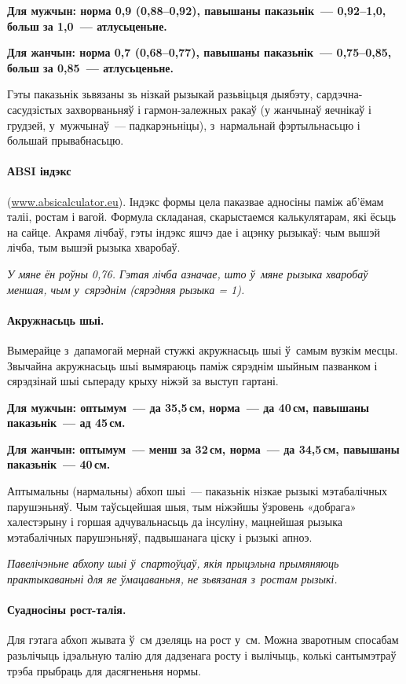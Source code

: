 \textbf{Для мужчын: норма 0,9 (0,88--0,92), павышаны паказьнік~--- 0,92--1,0, больш за 1,0~--- атлусьценьне.} 

\textbf{Для жанчын: норма 0,7 (0,68--0,77), павышаны паказьнік~--- 0,75--0,85, больш за 0,85~--- атлусьценьне.}

Гэты паказьнік зьвязаны зь нізкай рызыкай разьвіцьця дыябэту, сардэчна-сасудзістых захворваньняў і гармон-залежных ракаў (у жанчынаў яечнікаў і грудзей, у~мужчынаў~--- падкарэньніцы), з~нармальнай фэртыльнасьцю і большай прывабнасьцю.

\paragraph{АBSI індэкс} (\url{www.absicalculator.eu}). Індэкс формы цела паказвае адносіны паміж аб'ёмам таліі, ростам і вагой. Формула складаная, скарыстаемся калькулятарам, які ёсьць на сайце. Акрамя лічбаў, гэты індэкс яшчэ дае і ацэнку рызыкаў: чым вышэй лічба, тым вышэй рызыка хваробаў. 

\emph{У мяне ён роўны 0,76. Гэтая лічба азначае, што ў~мяне рызыка хваробаў меншая, чым у~сярэднім (сярэдняя рызыка = 1).}

\paragraph{Акружнасьць шыі.} Вымерайце з~дапамогай мернай стужкі акружнасьць шыі ў~самым вузкім месцы. Звычайна акружнасьць шыі вымяраюць паміж сярэднім шыйным пазванком і сярэдзінай шыі сьпераду крыху ніжэй за выступ гартані. 

\textbf{Для мужчын: оптымум~--- да 35,5\,см, норма~--- да 40\,см, павышаны паказьнік~--- ад 45\,см.} 

\textbf{Для жанчын: оптымум~--- менш за 32\,см, норма~--- да 34,5\,см, павышаны паказьнік~--- 40\,см.}

Аптымальны (нармальны) абхоп шыі~--- паказьнік нізкае рызыкі мэтабалічных парушэньняў. Чым таўсьцейшая шыя, тым ніжэйшы ўзровень «добрага» халестэрыну і горшая адчувальнасьць да інсуліну, мацнейшая рызыка мэтабалічных парушэньняў, падвышанага ціску і рызыкі апноэ. 

\emph{Павелічэньне абхопу шыі ў~спартоўцаў, якія прыцэльна прымяняюць практыкаваньні для яе ўмацаваньня, не зьвязаная з~ростам рызыкі.}

\paragraph{Суадносіны рост-талія.} Для гэтага абхоп жывата ў~см дзеляць на рост у~см. Можна зваротным спосабам разьлічыць ідэальную талію для дадзенага росту і вылічыць, колькі сантымэтраў трэба прыбраць для дасягненьня нормы. 

